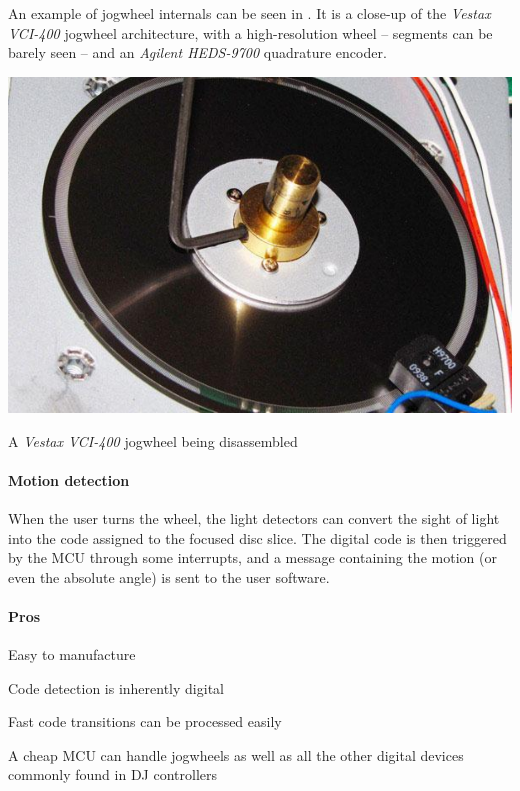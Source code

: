 \documentclass[a4paper,10pt]{article}
\makeatletter
\newenvironment{figurehere}{\def\@captype{figure}\vspace{2ex}}{\vspace{2ex}}
\makeatother
\begin{document}
\begin{multicols}{2}
An example of jogwheel internals can be seen in .
It is a close-up of the \emph{Vestax VCI-400} \cite{vestax_vci400} jogwheel
architecture, with a high-resolution wheel -- segments can be barely seen --
and an \emph{Agilent HEDS-9700} quadrature encoder.

\begin{figurehere}
	\centering
	\includegraphics[keepaspectratio=true,width=0.8\columnwidth]{images/vestax_vci400_jogwheel.pdf}
	\caption{A \emph{Vestax VCI-400} jogwheel being disassembled}
	\label{fig:vestax_vci400_jogwheel}
\end{figurehere}


\paragraph{Motion detection}
When the user turns the wheel, the light detectors can convert the sight of
light into the code assigned to the focused disc slice. The digital code is
then triggered by the MCU through some interrupts, and a message containing
the motion (or even the absolute angle) is sent to the user software.

\paragraph{Pros}
\begin{itemize*}
	\item Easy to manufacture
	\item Code detection is inherently digital
	\item Fast code transitions can be processed easily
	\item A cheap MCU can handle jogwheels as well as all the other digital
		devices commonly found in DJ controllers
\end{itemize*}



\end{multicols}
\end{document}
